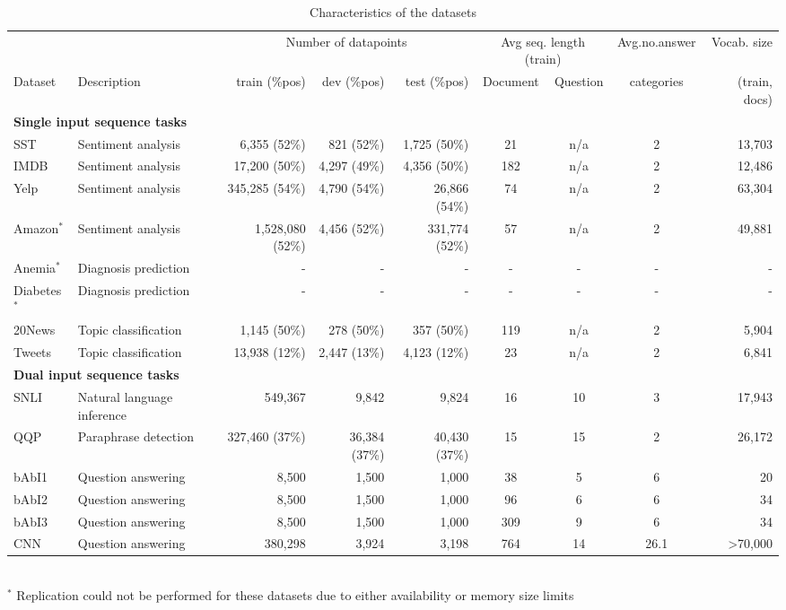 \begin{table}[h]
    \sffamily \scriptsize
    \centering
    \begin{tabular}{llrrrcccr}
    \toprule
    & & \multicolumn{3}{c}{Number of datapoints} & \multicolumn{2}{c}{Avg seq. length (train)} & Avg.no.answer & Vocab. size\\
    Dataset & Description & train (\%pos) & dev (\%pos) & test (\%pos) & Document & Question & categories& (train, docs)\\
    \cmidrule(r){1-2} \cmidrule(r){3-5} \cmidrule(r){6-7} \cmidrule(r){8-8} \cmidrule(r){9-9}
    \multicolumn{5}{l}{\textbf{Single input sequence tasks}}\\
    \cmidrule(r){1-9}
        SST & Sentiment analysis  & 6,355 (52\%) & 821 (52\%) & 1,725 (50\%) & 21 & n/a & 2 & 13,703\\
        IMDB & Sentiment analysis  & 17,200 (50\%)& 4,297 (49\%) & 4,356 (50\%) & 182 & n/a & 2& 12,486\\
        Yelp & Sentiment analysis &345,285 (54\%)&4,790 (54\%)&26,866 (54\%)&74&n/a&2&63,304  \\
        Amazon$^*$&Sentiment analysis&1,528,080 (52\%)&4,456 (52\%)&331,774 (52\%)&57&n/a&2&49,881\\
        Anemia$^*$&Diagnosis prediction&-&-&-&-&-&-&-\\
        Diabetes$^*$&Diagnosis prediction&-&-&-&-&-&-&-\\
        20News & Topic classification & 1,145 (50\%)&278 (50\%) &357 (50\%)&119&n/a&2&5,904\\
        Tweets & Topic classification & 13,938 (12\%)&2,447 (13\%)&4,123 (12\%)&23&n/a&2&6,841 \\
    \cmidrule(r){1-2} \cmidrule(r){3-5} \cmidrule(r){6-7} \cmidrule(r){8-8} \cmidrule(r){9-9}    
    \multicolumn{5}{l}{\textbf{Dual input sequence tasks}}\\ 
    \cmidrule(r){1-9}
        SNLI & Natural language inference & 549,367 & 9,842 & 9,824 & 16 & 10 & 3& 17,943\\
        QQP & Paraphrase detection & 327,460 (37\%)&36,384 (37\%)&40,430 (37\%) &15&15&2&26,172\\
        bAbI1 & Question answering & 8,500 & 1,500 & 1,000& 38&5& 6 & 20\\
        bAbI2 & Question answering&8,500&1,500&1,000&96&6&6&34\\
        bAbI3 & Question answering&8,500&1,500&1,000&309&9&6&34\\
        CNN & Question answering&380,298&3,924&3,198&764&14&26.1&>70,000\\
        \bottomrule
    \end{tabular}\\
    \scriptsize{$^*$ Replication could not be performed for these datasets due to either availability or memory size limits}\\
    \caption{Characteristics of the datasets}
    \label{tab:datasets}
\end{table}

